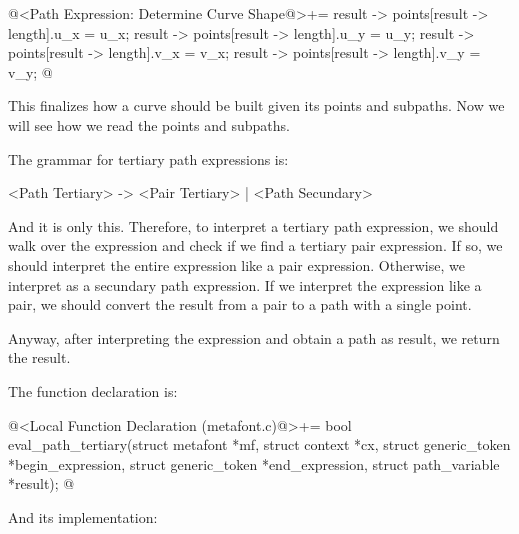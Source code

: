 \iniciocodigo
@<Path Expression: Determine Curve Shape@>+=
result -> points[result -> length].u_x = u_x;
result -> points[result -> length].u_y = u_y;
result -> points[result -> length].v_x = v_x;
result -> points[result -> length].v_y = v_y;
@
\fimcodigo

This finalizes how a curve should be built given its points and
subpaths. Now we will see how we read the points and subpaths.


The grammar for tertiary path expressions is:

\alinhaverbatim
<Path Tertiary> -> <Pair Tertiary> | <Path Secundary>
\alinhanormal

And it is only this. Therefore, to interpret a tertiary path
expression, we should walk over the expression and check if we find a
tertiary pair expression. If so, we should interpret the entire
expression like a pair expression. Otherwise, we interpret as a
secundary path expression. If we interpret the expression like a pair,
we should convert the result from a pair to a path with a single
point.

Anyway, after interpreting the expression and obtain a path as result,
we return the result.

The function declaration is:

\iniciocodigo
@<Local Function Declaration (metafont.c)@>+=
bool eval_path_tertiary(struct metafont *mf, struct context *cx,
                        struct generic_token *begin_expression,
                        struct generic_token *end_expression,
                        struct path_variable *result);
@
\fimcodigo

And its implementation:

